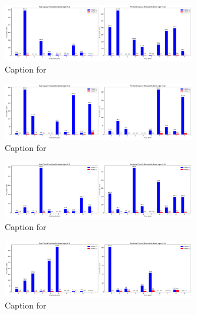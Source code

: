 \documentclass{article}
\begin{document}
\begin{figure}[!htbp]
\centering
\includegraphics[width=0.75\textwidth]{combined_class_boundary_pgd/combined_class_2_misclassifications_eps_0.3.png}
\caption{Caption for }
\label{fig:combined_class_2_misclassifications_eps_0.3.png}
\end{figure}

\begin{figure}[!htbp]
\centering
\includegraphics[width=0.75\textwidth]{combined_class_boundary_pgd/combined_class_4_misclassifications_eps_0.3.png}
\caption{Caption for }
\label{fig:combined_class_4_misclassifications_eps_0.3.png}
\end{figure}

\begin{figure}[!htbp]
\centering
\includegraphics[width=0.75\textwidth]{combined_class_boundary_pgd/combined_class_5_misclassifications_eps_0.3.png}
\caption{Caption for }
\label{fig:combined_class_5_misclassifications_eps_0.3.png}
\end{figure}

\begin{figure}[!htbp]
\centering
\includegraphics[width=0.75\textwidth]{combined_class_boundary_pgd/combined_class_6_misclassifications_eps_0.3.png}
\caption{Caption for }
\label{fig:combined_class_6_misclassifications_eps_0.3.png}
\end{figure}
\end{document}
